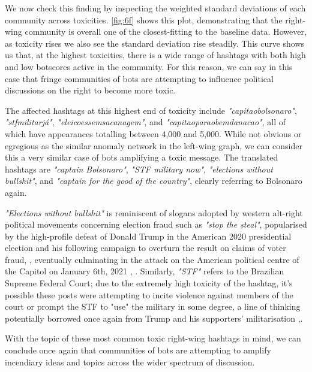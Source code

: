 \documentclass[a4paper,11pt]{article}  %
\begin{document}
	We now check this finding by inspecting the weighted standard deviations of each community across toxicities. \autoref{fig:6f} shows this plot, demonstrating that the right-wing community is overall one of the closest-fitting to the baseline data. However, as toxicity rises we also see the standard deviation rise steadily. This curve shows us that, at the highest toxicities, there is a wide range of hashtags with both high and low botscores active in the community. For this reason, we can say in this case that fringe communities of bots are attempting to influence political discussions on the right to become more toxic. 
	
	The affected hashtags at this highest end of toxicity include \textit{"capitaobolsonaro"}, \textit{"stfmilitarjá"}, \textit{"eleicoessemsacanagem"}, and \textit{"capitaoparaobemdanacao"}, all of which have appearances totalling between 4,000 and 5,000. While not obvious or egregious as the similar anomaly network in the left-wing graph, we can consider this a very similar case of bots amplifying a toxic message. The translated hashtags are \textit{"captain Bolsonaro"}, \textit{"STF military now"}, \textit{"elections without bullshit"}, and \textit{"captain for the good of the country"}, clearly referring to Bolsonaro again. 
	
	\textit{"Elections without bullshit"} is reminiscent of slogans adopted by western alt-right political movements concerning election fraud such as \textit{"stop the steal"}, popularised by the high-profile defeat of Donald Trump in the American 2020 presidential election\parencite{FederalElections2020a} and his following campaign to overturn the result on claims of voter fraud\parencite{rutenberg77DaysTrump2021}, \parencite{ruparTrumpDesperateSTOP2020}, eventually culminating in the attack on the American political centre of the Capitol on January 6th, 2021 \parencite{JanuaryAttackCapitol}, \parencite{JanuaryCapitolAttack2024}. Similarly, \textit{"STF"} refers to the Brazilian Supreme Federal Court\parencite{STJInternationalSuperior}; due to the extremely high toxicity of the hashtag, it's possible these posts were attempting to incite violence against members of the court or prompt the STF to "use" the military in some degree, a line of thinking potentially borrowed once again from Trump and his supporters' militarisation \parencite{lohStopStealLeader},\parencite{sonmezFrustratedTrumpRedoubles2020}. 
	
	With the topic of these most common toxic right-wing hashtags in mind, we can conclude once again that communities of bots are attempting to amplify incendiary ideas and topics across the wider spectrum of discussion.
	
\end{document}
